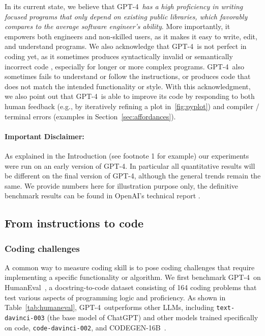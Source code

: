 In its current state, we believe that GPT-4\ \textit{has a high proficiency in writing focused programs that only depend on existing public libraries, which favorably compares to the average software engineer's ability}. More importantly, it empowers both engineers and non-skilled users, as it makes it easy to write, edit, and understand programs. We also acknowledge that GPT-4\ is not perfect in coding yet, as it sometimes produces syntactically invalid or semantically incorrect code , especially for longer or more complex programs. GPT-4\ also sometimes fails to understand or follow the instructions, or produces code that does not match the intended functionality or style. With this acknowledgment, we also point out that GPT-4\ is able to improve its code by responding to both human feedback (e.g., by iteratively refining a plot in~\ref{fig:pyplot}) and compiler / terminal errors (examples in Section~\ref{sec:affordances}).

\paragraph{Important Disclaimer:} As explained in the Introduction (see footnote 1 for example) our experiments were run on an early version of GPT-4. In particular all quantitative results will be different on the final version of GPT-4, although the general trends remain the same. We provide numbers here for illustration purpose only, the definitive benchmark results can be found in OpenAI's technical report \cite{gpt4}.

\subsection{From instructions to code}

\subsubsection{Coding challenges}

A common way to measure coding skill is to pose coding challenges that require implementing a specific functionality or algorithm. We first benchmark GPT-4\ on HumanEval~\cite{humaneval}, a docstring-to-code dataset consisting of 164 coding problems that test various aspects of programming logic and proficiency. As shown in Table~\ref{tab:humaneval}, GPT-4\ outperforms other LLMs, including \texttt{text-davinci-003} (the base model of ChatGPT) and other models trained specifically on code, \texttt{code-davinci-002}, and CODEGEN-16B~\cite{codegen}.

